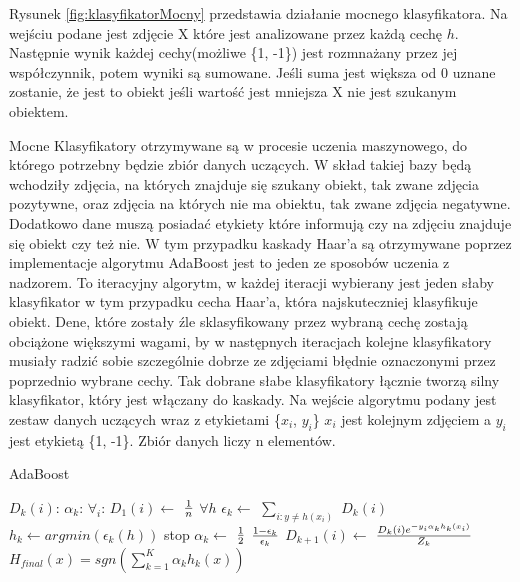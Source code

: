 Rysunek \ref{fig:klasyfikatorMocny} przedstawia działanie mocnego klasyfikatora. Na wejściu podane jest zdjęcie X które jest analizowane przez każdą cechę $h$. Następnie wynik każdej cechy(możliwe \{1, -1\}) jest rozmnażany przez jej współczynnik, potem wyniki są sumowane. Jeśli suma jest większa od 0 uznane zostanie, że jest to obiekt jeśli wartość jest mniejsza X nie jest szukanym obiektem.

Mocne Klasyfikatory otrzymywane są w procesie uczenia maszynowego, do którego potrzebny będzie zbiór danych uczących. W skład takiej bazy będą wchodziły zdjęcia, na których znajduje się szukany obiekt, tak zwane zdjęcia pozytywne, oraz zdjęcia na których nie ma obiektu, tak zwane zdjęcia negatywne. Dodatkowo dane muszą posiadać etykiety które informują czy na zdjęciu znajduje się obiekt czy też nie. W tym przypadku kaskady Haar’a są otrzymywane poprzez implementacje algorytmu AdaBoost jest to jeden ze sposobów uczenia z nadzorem. To iteracyjny algorytm, w każdej iteracji wybierany  jest jeden słaby klasyfikator w tym przypadku cecha Haar’a, która najskuteczniej klasyfikuje obiekt. Dene, które zostały źle sklasyfikowany przez wybraną cechę zostają obciążone większymi wagami, by w następnych iteracjach kolejne klasyfikatory musiały radzić sobie szczególnie dobrze ze zdjęciami błędnie oznaczonymi przez poprzednio wybrane cechy. Tak dobrane słabe klasyfikatory łącznie tworzą silny klasyfikator, który jest włączany do kaskady. Na wejście algorytmu podany jest zestaw danych uczących wraz z etykietami \{$x_{i}$, $y_{i}$\} $x_{i}$ jest kolejnym zdjęciem a $y_{i}$ jest etykietą \{1, -1\}. Zbiór danych liczy n elementów.

\begin{algorithm}[H]
\caption{AdaBoost}
\begin{algorithmic} 
\DontPrintSemicolon
\STATE $D_k(i)$: 
\STATE $\alpha_k$:
\STATE $\forall_i$: $D_1(i) \gets$ ${1} \over {n}$ 
\STATE $\forall h$ $\epsilon_k \gets$ $\sum_{i:y\neq h(x_i)}^{} $ $D_k(i)$ 
\STATE $h_k \gets argmin(\epsilon_k(h))$ 
\STATE stop 
\ELSE
\STATE $\alpha_k \gets $ $1 \over 2$ $1- \epsilon_k \over \epsilon_k$
\STATE $D_{k+1}(i) \gets$ $D_k(i)e^{-y_i\alpha_k h_k(x_i)} \over Z_k$
\ENDIF
\ENDFOR
\STATE $H_{final}(x) = sgn(\sum_{k=1}^{K} \alpha_k h_k(x))$
\end{algorithmic}
\end{algorithm}


